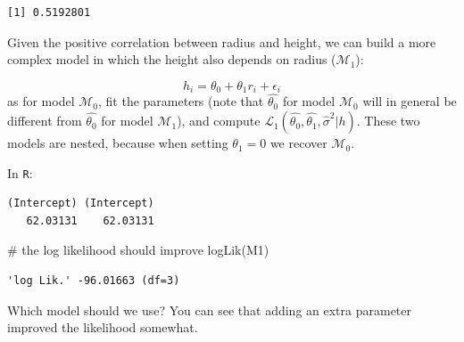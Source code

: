 \documentclass[
  letterpaper,
  DIV=11,
  numbers=noendperiod]{scrreprt}
\newenvironment{Shaded}{\begin{snugshade}}{\end{snugshade}}
\newcommand{\AttributeTok}[1]{\textcolor[rgb]{0.40,0.45,0.13}{#1}}
\newcommand{\CommentTok}[1]{\textcolor[rgb]{0.37,0.37,0.37}{#1}}
\newcommand{\DecValTok}[1]{\textcolor[rgb]{0.68,0.00,0.00}{#1}}
\newcommand{\FunctionTok}[1]{\textcolor[rgb]{0.28,0.35,0.67}{#1}}
\newcommand{\NormalTok}[1]{\textcolor[rgb]{0.00,0.23,0.31}{#1}}
\newcommand{\OtherTok}[1]{\textcolor[rgb]{0.00,0.23,0.31}{#1}}
\newcommand{\SpecialCharTok}[1]{\textcolor[rgb]{0.37,0.37,0.37}{#1}}
\begin{document}
\begin{verbatim}
[1] 0.5192801
\end{verbatim}

Given the positive correlation between radius and height, we can build a
more complex model in which the height also depends on radius
(\(\mathcal M_1\)):

\[
h_i = \theta_0 + \theta_1 r_i + \epsilon_i
\] as for model \(\mathcal M_0\), fit the parameters (note that
\(\hat{\theta_0}\) for model \(\mathcal M_0\) will in general be
different from \(\hat{\theta_0}\) for model \(\mathcal M_1\)), and
compute
\(\mathcal L_1(\hat{\theta_0},\hat{\theta_1},\hat{\sigma}^2 \vert h)\).
These two models are nested, because when setting \(\theta_1 = 0\) we
recover \(\mathcal M_0\).

In \texttt{R}:

\begin{Shaded}
\end{Shaded}

\begin{verbatim}
(Intercept) (Intercept) 
   62.03131    62.03131 
\end{verbatim}

\begin{Shaded}
\begin{Highlighting}[]
\CommentTok{\# the log likelihood should improve}
\FunctionTok{logLik}\NormalTok{(M1)}
\end{Highlighting}
\end{Shaded}

\begin{verbatim}
'log Lik.' -96.01663 (df=3)
\end{verbatim}

Which model should we use? You can see that adding an extra parameter
improved the likelihood somewhat.
\end{document}

